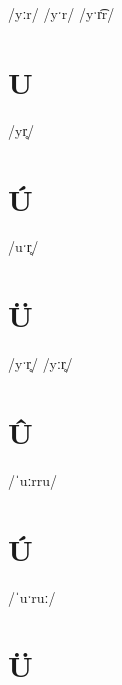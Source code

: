 \documentclass[10pt,a4paper,twoside]{book}
\begin{document}
\begin{multicols}{3}
 {/yːr/} {}
 {/yˑr/} {}
 {/yˑr͡r/} {}
\end{multicols}

\section*{U}

\begin{multicols}{3}
 {/yr̥/} {}
\end{multicols}

\section*{Ú}

\begin{multicols}{3}
 {/uˑr̥/} {}
\end{multicols}

\section*{Ü}

\begin{multicols}{3}
 {/yˑr̥/} {}
 {/yːr̥/} {}
\end{multicols}

\section*{Û}

\begin{multicols}{3}
 {/ˈuːrru/} {}
\end{multicols}

\section*{Ú}

\begin{multicols}{3}
 {/ˈuˑruː/} {}
\end{multicols}

\section*{Ü}
\end{document}
